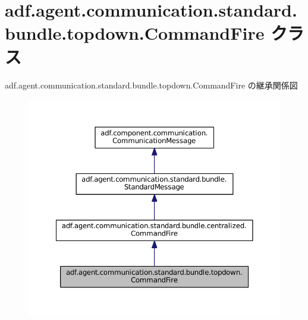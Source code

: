 \hypertarget{classadf_1_1agent_1_1communication_1_1standard_1_1bundle_1_1topdown_1_1CommandFire}{}\section{adf.\+agent.\+communication.\+standard.\+bundle.\+topdown.\+Command\+Fire クラス}
\label{classadf_1_1agent_1_1communication_1_1standard_1_1bundle_1_1topdown_1_1CommandFire}


adf.\+agent.\+communication.\+standard.\+bundle.\+topdown.\+Command\+Fire の継承関係図
\nopagebreak
\begin{figure}[H]
\begin{center}
\leavevmode
\includegraphics[width=350pt]{classadf_1_1agent_1_1communication_1_1standard_1_1bundle_1_1topdown_1_1CommandFire__inherit__graph}
\end{center}
\end{figure}


